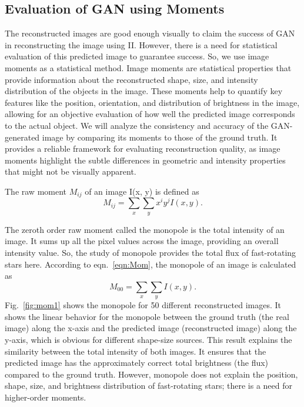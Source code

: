 \subsection{Evaluation of GAN using Moments}
The reconstructed images are good enough visually to claim the success of GAN in reconstructing the image using II. However, there is a need for statistical evaluation of this predicted image to guarantee success. So, we use image moments as a statistical method. Image moments are statistical properties that provide information about the reconstructed shape, size, and intensity distribution of the objects in the image. These moments help to quantify key features like the position, orientation, and distribution of brightness in the image, allowing for an objective evaluation of how well the predicted image corresponds to the actual object. We will analyze the consistency and accuracy of the GAN-generated image by comparing its moments to those of the ground truth. It provides a reliable framework for evaluating reconstruction quality, as image moments highlight the subtle differences in geometric and intensity properties that might not be visually apparent. 

The raw moment $M_{ij}$ of an image I(x, y) is defined as \citep{hu1962visual}
\begin{equation}
	M_{ij} = \sum_{x} \sum_{y} x^i y^j I(x, y).
	\label{eqn:Mom}
\end{equation}

The zeroth order raw moment called the monopole is the total intensity of an image. It sums up all the pixel values across the image, providing an overall intensity value. So, the study of monopole provides the total flux of fast-rotating stars here. According to eqn.~\ref{eqn:Mom}, the monopole of an image is calculated as 
\begin{equation}
	M_{00} = \sum_{x} \sum_{y} I(x, y).
\end{equation}
Fig.~\ref{fig:mom1} shows the monopole for 50 different reconstructed images. It shows the linear behavior for the monopole between the ground truth (the real image) along the x-axis and the predicted image (reconstructed image) along the y-axis, which is obvious for different shape-size sources. This result explains the similarity between the total intensity of both images. It ensures that the predicted image has the approximately correct total brightness (the flux) compared to the ground truth. However, monopole does not explain the position, shape, size, and brightness distribution of fast-rotating stars; there is a need for higher-order moments.

